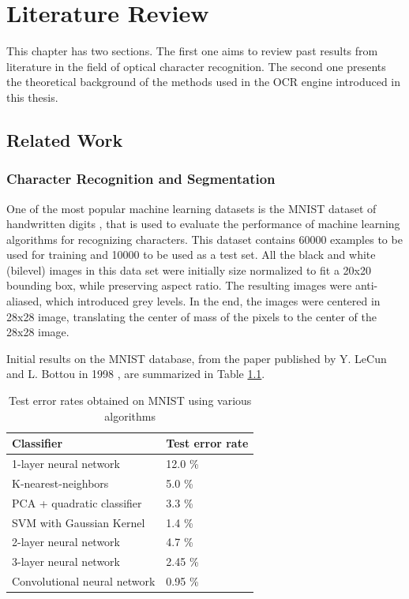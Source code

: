 \chapter{Literature Review}
\label{chap:lit_rev}
This chapter has two sections. The first one aims to review past results from literature in the field of optical character recognition. The second one presents the theoretical background of the methods used in the OCR engine introduced in this thesis. 

\section{Related Work}
\subsection{Character Recognition and Segmentation}
One of the most popular machine learning datasets is the MNIST dataset of handwritten digits  \cite{lecun1998mnist}, that is used to evaluate the performance of machine learning algorithms for recognizing characters. This dataset contains 60000 examples to be used for training and 10000 to be used as a test set. All the black and white (bilevel) images in this data set were initially size normalized to fit a 20x20 bounding box, while preserving aspect ratio. The resulting images were anti-aliased, which introduced grey levels. In the end, the images were centered in 28x28 image, translating the center of mass of the pixels to the center of the 28x28 image. 

Initial results on the MNIST database, from the paper published by Y. LeCun and L. Bottou in 1998 \cite{Lecun_1998}, are summarized in Table \ref{table:mnist_results}. 

\begin{table}[h]
\caption{Test error rates obtained on MNIST using various algorithms}
\label{table:mnist_results}
\begin{tabular}{ll}
\hline
Classifier                   & Test error rate \\ \hline
1-layer neural network       & 12.0 \%           \\
K-nearest-neighbors          & 5.0  \%           \\
PCA + quadratic classifier   & 3.3  \%          \\
SVM with Gaussian Kernel     & 1.4  \%           \\
2-layer neural network       & 4.7  \%           \\
3-layer neural network       & 2.45 \%           \\
Convolutional neural network & 0.95 \%           \\ \hline
\end{tabular}
\end{table}

